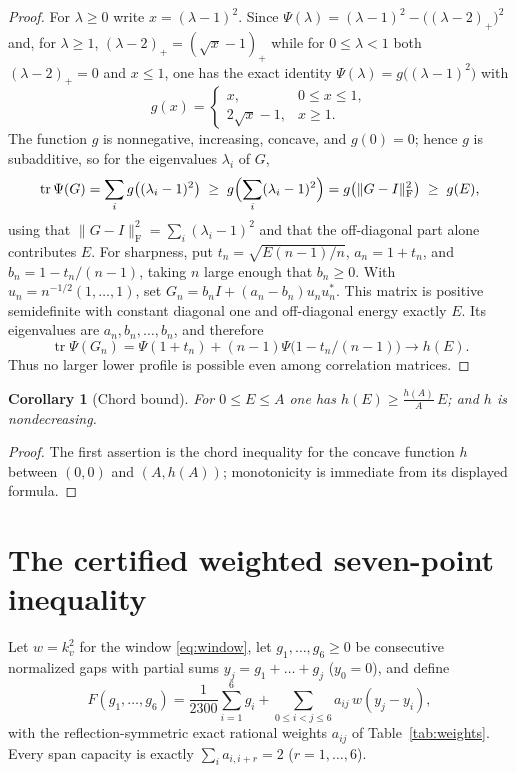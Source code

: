 \documentclass[11pt]{article}
\newtheorem{corollary}[theorem]{Corollary}
\DeclareMathOperator{\tr}{tr}
\newcommand{\F}{\mathrm F}
\begin{document}
\begin{proof}
For $\lambda\ge0$ write $x=(\lambda-1)^2$.  Since
$\Psi(\lambda)=(\lambda-1)^2-\bigl((\lambda-2)_+\bigr)^2$ and, for
$\lambda\ge1$, $(\lambda-2)_+=(\sqrt x-1)_+$ while for $0\le\lambda<1$ both
$(\lambda-2)_+=0$ and $x\le1$, one has the exact identity
$\Psi(\lambda)=g\bigl((\lambda-1)^2\bigr)$ with
\[
 g(x)=\begin{cases}x,&0\le x\le1,\\ 2\sqrt x-1,&x\ge1.\end{cases}
\]
The function $g$ is nonnegative, increasing, concave, and $g(0)=0$; hence $g$
is subadditive, so for the eigenvalues $\lambda_i$ of $G$,
\[
 \tr\Psi(G)=\sum_i g\bigl((\lambda_i-1)^2\bigr)
 \;\ge\;g\Bigl(\sum_i(\lambda_i-1)^2\Bigr)
 =g\bigl(\|G-I\|_{\F}^2\bigr)\;\ge\;g(E),
\]
using that $\|G-I\|_{\F}^2=\sum_i(\lambda_i-1)^2$ and that the off-diagonal
part alone contributes $E$.  For sharpness, put
$t_n=\sqrt{E(n-1)/n}$, $a_n=1+t_n$, and
$b_n=1-t_n/(n-1)$, taking $n$ large enough that $b_n\ge0$.  With
$u_n=n^{-1/2}(1,\ldots,1)$, set
$G_n=b_nI+(a_n-b_n)u_nu_n^*$.  This matrix is positive semidefinite with
constant diagonal one and off-diagonal energy exactly $E$.  Its eigenvalues
are $a_n,b_n,\ldots,b_n$, and therefore
\[
 \tr\Psi(G_n)=\Psi(1+t_n)+(n-1)\Psi\bigl(1-t_n/(n-1)\bigr)
 \longrightarrow h(E).
\]
Thus no larger lower profile is possible even among correlation matrices.
\end{proof}

\begin{corollary}[Chord bound]\label{cor:chord}
For $0\le E\le A$ one has $h(E)\ge\frac{h(A)}{A}\,E$; and $h$ is
nondecreasing.
\end{corollary}

\begin{proof}
The first assertion is the chord inequality for the concave function $h$
between $(0,0)$ and $(A,h(A))$; monotonicity is immediate from its displayed
formula.
\end{proof}

\section{The certified weighted seven-point inequality}\label{sec:seven}

Let $w=k_v^2$ for the window \eqref{eq:window}, let $g_1,\dots,g_6\ge0$ be
consecutive normalized gaps with partial sums $y_j=g_1+\dots+g_j$
($y_0=0$), and define
\begin{equation}\label{eq:F}
 F(g_1,\dots,g_6)
 =\frac{1}{2300}\sum_{i=1}^{6}g_i
 +\sum_{0\le i<j\le6}a_{ij}\,w(y_j-y_i),
\end{equation}
with the reflection-symmetric exact rational weights $a_{ij}$ of
Table~\ref{tab:weights}.  Every span capacity is exactly
$\sum_{i}a_{i,i+r}=2$ ($r=1,\dots,6$).
\end{document}
